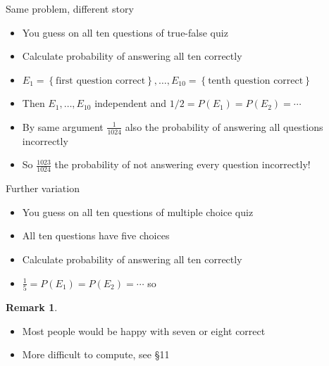 \documentclass[handout]{beamer}
\theoremstyle{definition}
\newtheorem{remark}{Remark}
\begin{document}
\begin{frame}{Same problem, different story}
\begin{itemize}
\item You guess on all ten questions of true-false quiz
\item Calculate probability of answering all ten correctly
\item $E_1=\left\{\text{first question correct}\right\},\ldots,
E_{10}=\left\{\text{tenth question correct}\right\}$
\item Then $E_1,\ldots,E_{10}$ independent
and $1/2=P\left(E_1\right)=P\left(E_2\right)=\cdots$
\item By same argument $\frac{1}{1024}$ also the probability
of answering all questions \alert{incorrectly}
\item So $\frac{1023}{1024}$ the probability of
\alert{not} answering every question incorrectly!
\end{itemize}
\end{frame}

\begin{frame}{Further variation}
\begin{itemize}
\item You guess on all ten questions of multiple choice quiz
\item All ten questions have five choices
\item Calculate probability of answering all ten correctly
\item $\frac{1}{5}=P\left(E_1\right)=P\left(E_2\right)=\cdots$ so
\end{itemize}
\begin{remark}
\begin{itemize}
\item Most people would be happy with seven or eight correct
\item More difficult to compute, see \S11
\end{itemize}
\end{remark}
\end{frame}
\end{document}
